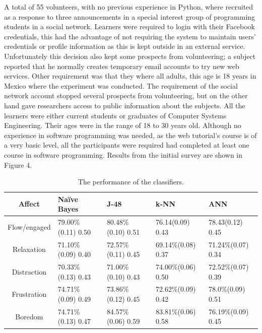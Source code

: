 \documentclass[conference]{IEEEtran}
\begin{document}
A total of 55 volunteers, with no previous experience in Python, where recruited
as a response to three announcements in a special interest group of programming
students in a social network. Learners were required to login with their
Facebook credentials, this had the advantage of not requiring the system to
maintain users’ credentials or profile information as this is kept outside in an
external service. Unfortunately this decision also kept some prospects from
volunteering; a subject reported that he normally creates temporary email
accounts to try new web services. Other requirement was that they where all
adults, this age is 18 years in Mexico where the experiment was conducted. The
requirement of the social network account stopped several prospects from
volunteering, but on the other hand gave researchers access to public
information about the subjects. All the learners were either current students or
graduates of Computer Systems Engineering. Their ages were in the range of 18 to
30 years old. Although no experience in software programming was needed, as the
web tutorial's course is of a very basic level, all the participants were
required had completed at least one course in software programming. Results from
the initial survey are shown in Figure 4.
\begin{table}[!t]
\centering
\caption{The performance of the classifiers.}
    \begin{tabular}{ | c | l | l | l | l | }
    \hline
    Affect          & Naïve Bayes           & J-48                & k-NN              & ANN \\
    \hline
    Flow/engaged    & 79.00\% (0.11) 0.50   & 80.48\% (0.10) 0.51 & 76.14(0.09) 0.43    & 78.43(0.12) 0.45 \\
    \hline
    Relaxation      & 71.10\% (0.09) 0.40   & 72.57\% (0.11) 0.45 & 69.14\%(0.08)  0.37 & 71.24\%(0.07)  0.34\\
    \hline
    Distraction     & 70.33\% (0.13)  0.43  & 71.00\% (0.10) 0.43 & 74.00\%(0.06)  0.50 & 72.52\%(0.07)  0.39\\
    \hline
    Frustration     & 74.71\% (0.09) 0.49   & 73.86\% (0.12) 0.45 & 72.62\%(0.09)  0.42 & 78.0\%(0.09)  0.51 \\
    \hline
    Boredom         & 74.71\% (0.13) 0.47   & 84.57\% (0.06) 0.59 & 83.81\%(0.06)  0.58 & 76.19\%(0.09)  0.45\\
    \hline
    \end{tabular}
\end{table}
\end{document}
